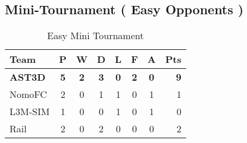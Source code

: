 \subsection{Mini-Tournament ( Easy Opponents )}

\begin{table}
\begin{center}
\begin{tabular}{l*{6}{c}r}
Team              	& P & W & D & L & F  & A & Pts \\ \hline
\textbf{AST3D} 		& \textbf{5} & \textbf{2} & \textbf{3} & \textbf{0} & \textbf{ 2} & \textbf{0} &  \textbf{9}  \\
NomoFC            	& 2 & 0 & 1 & 1 &  0 & 1 &  1  \\
L3M-SIM     		& 1 & 0 & 0 & 1 &  0 & 1 &  0  \\
Rail     		    & 2 & 0 & 2 & 0 &  0 & 0 &  2  \\
\end{tabular}
\end{center}
\label{EasyTournament}
\caption{Easy Mini Tournament}
\end{table}